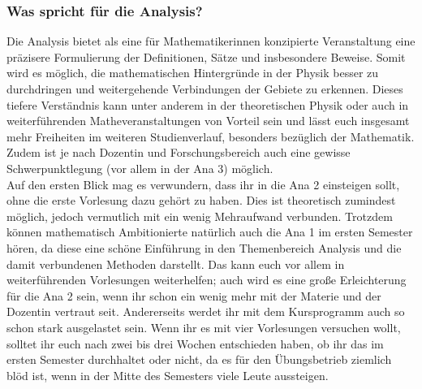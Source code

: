 \subsubsection{Was spricht für die Analysis?}
Die Analysis bietet als eine für Mathematikerinnen konzipierte Veranstaltung eine präzisere Formulierung der Definitionen, Sätze und insbesondere Beweise. Somit wird es möglich, die mathematischen Hintergründe in der Physik besser zu durchdringen und weitergehende Verbindungen der Gebiete zu erkennen. Dieses tiefere Verständnis kann unter anderem in der theoretischen Physik oder auch in weiterführenden Matheveranstaltungen von Vorteil sein und lässt euch insgesamt mehr Freiheiten im weiteren Studienverlauf, besonders bezüglich der Mathematik. Zudem ist je nach Dozentin und Forschungsbereich auch eine gewisse Schwerpunktlegung (vor allem in der \gls{Ana} 3) möglich.\\

Auf den ersten Blick mag es verwundern, dass ihr in die \gls{Ana} 2 einsteigen sollt, ohne die erste Vorlesung dazu gehört zu haben. Dies ist theoretisch zumindest möglich, jedoch vermutlich mit ein wenig Mehraufwand verbunden. Trotzdem können mathematisch Ambitionierte natürlich auch die \gls{Ana} 1 im ersten Semester hören, da diese eine schöne Einführung in den Themenbereich Analysis und die damit verbundenen Methoden darstellt. Das kann euch vor allem in weiterführenden Vorlesungen weiterhelfen; auch wird es eine große Erleichterung für die \gls{Ana} 2 sein, wenn ihr schon ein wenig mehr mit der Materie und der Dozentin vertraut seit. Andererseits werdet ihr mit dem Kursprogramm auch so schon stark ausgelastet sein. Wenn ihr es mit vier Vorlesungen versuchen wollt, solltet ihr euch nach zwei bis drei Wochen entschieden haben, ob ihr das im ersten Semester durchhaltet oder nicht, da es für den Übungsbetrieb ziemlich blöd ist, wenn in der Mitte des Semesters viele Leute aussteigen.

\vfill

